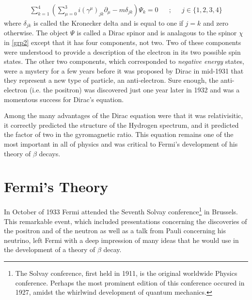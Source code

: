 \documentclass[a4paper,12pt]{book}
\begin{document}
\begin{align}
\displaystyle\sum_{k = 1}^{4}\left(\displaystyle\sum_{\mu = 0}^{3}i(\gamma^{\mu})_{jk}\partial_{\mu}-m\delta_{jk} \right)\Psi_{k}=0 && ; && j\in\{1,2,3,4\}
\end{align}
where $\delta_{jk}$ is called the Kronecker delta and is equal to one if $j=k$ and zero otherwise. The object $\Psi$ is called a Dirac spinor and is analagous to the spinor $\chi$ in \ref{grp2} except that it has four components, not two. Two of these components were understood to provide a description of the electron in its two possible spin states. The other two components, which corresponded to \emph{negative energy} states, were a mystery for a few years before it was proposed by Dirac in mid-1931 that they represent a new type of particle, an anti-electron. Sure enough, the anti-electron (i.e. the positron) was discovered just one year later in 1932 and was a momentous success for Dirac's equation\cite{brandt}.

Among the many advantages of the Dirac equation were that it was relativisitic, it correctly predicted the structure of the Hydrogen spectrum, and it predicted the factor of two in the gyromagnetic ratio. This equation remains one of the most important in all of physics and was critical to Fermi's development of his theory of $\beta$ decays.

\section{Fermi's Theory}

In October of 1933 Fermi attended the Seventh Solvay conference\footnote{The Solvay conference, first held in 1911, is the original worldwide Physics conference. Perhaps the most prominent edition of this conference occured in 1927, amidst the whirlwind development of quantum mechanics.} in Brussels. This remarkable event, which included presentations concerning the discoveries of the positron and of the neutron as well as a talk from Pauli concerning his neutrino, left Fermi with a deep impression of many ideas that he would use in the development of a theory of $\beta$ decay.

\end{document}
